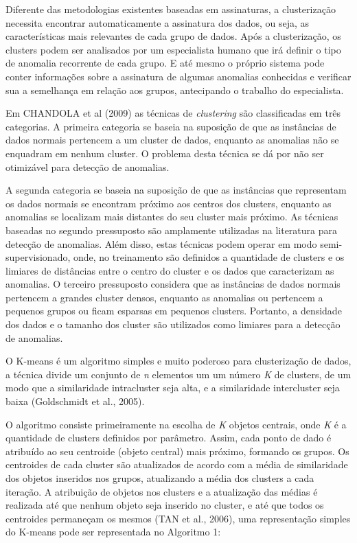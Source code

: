 \documentclass[12pt,openright,oneside,a4paper,english,spanish,brazil]{unifil}
\begin{document}
\indent Diferente das metodologias existentes baseadas em assinaturas, a clusterização necessita encontrar automaticamente a assinatura dos dados, ou seja, as características mais relevantes de cada grupo de dados. Após a clusterização, os clusters podem ser analisados por um especialista humano que irá definir o tipo de anomalia recorrente de cada grupo. E até mesmo o próprio sistema pode conter informações sobre a assinatura de algumas anomalias conhecidas e verificar sua a semelhança em relação aos grupos, antecipando o trabalho do especialista.

\indent Em  CHANDOLA et al (2009) as técnicas de \textit{clustering} são classificadas em três categorias. A primeira categoria se baseia na suposição de que as instâncias de dados normais pertencem a um cluster de dados, enquanto as anomalias não se enquadram em nenhum cluster. O problema desta técnica se dá por não ser otimizável para detecção de anomalias.

\indent A segunda categoria se baseia na suposição de que as instâncias que representam os dados normais se encontram próximo aos centros dos clusters, enquanto as anomalias se localizam mais distantes do seu cluster mais próximo. As técnicas baseadas no segundo pressuposto são amplamente utilizadas na literatura para detecção de anomalias. Além disso, estas técnicas podem operar em modo semi-supervisionado, onde, no treinamento são definidos a quantidade de clusters e os limiares de distâncias entre o centro do cluster e os dados que caracterizam as anomalias. O terceiro pressuposto considera que as instâncias de dados normais pertencem a grandes cluster  densos, enquanto as anomalias ou pertencem a pequenos grupos ou ficam esparsas em pequenos clusters. Portanto, a densidade dos dados e o tamanho dos cluster são utilizados como limiares para a detecção de anomalias.
    
\indent O K-means é um algoritmo simples e muito poderoso para clusterização de dados, a técnica divide um conjunto de \textit{n} elementos um um número \textit{K} de clusters, de um modo que a similaridade intracluster seja alta, e a similaridade intercluster seja baixa (Goldschmidt et al., 2005). 

\indent O algoritmo consiste primeiramente na escolha de \textit{K} objetos centrais, onde \textit{K} é a quantidade de clusters definidos por parâmetro. Assim, cada ponto de dado é atribuído ao seu centroide (objeto central) mais próximo, formando os grupos. Os centroides de cada cluster são atualizados de acordo com a média de similaridade dos objetos inseridos nos grupos, atualizando a média dos clusters a cada iteração. A atribuição de objetos nos clusters e a atualização das médias é realizada até que nenhum objeto seja inserido no cluster, e até que todos os centroides permaneçam os mesmos (TAN et al., 2006), uma representação simples do K-means pode ser representada no Algoritmo 1:
\end{document}
